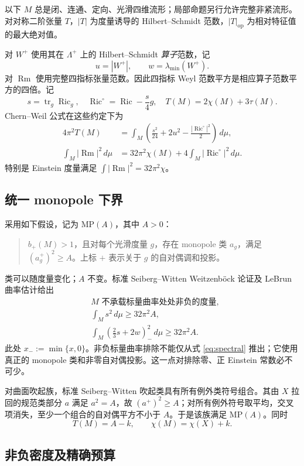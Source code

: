 \documentclass[UTF8,fontset=fandol,zihao=-4]{ctexart}
\theoremstyle{cn}
\DeclareMathOperator{\Ric}{Ric}
\DeclareMathOperator{\Rm}{Rm}
\DeclareMathOperator{\tr}{tr}
\newcommand{\op}{\mathrm{op}}
\newcommand{\dd}{\,d\mu}
\numberwithin{equation}{section}
\begin{document}
以下 $M$ 总是闭、连通、定向、光滑四维流形；局部命题另行允许完整非紧流形。对对称二阶张量 $T$，$|T|$ 为度量诱导的 Hilbert--Schmidt 范数，$|T|_{\op}$ 为相对特征值的最大绝对值。

对 $W^+$ 使用其在 $\Lambda^+$ 上的 Hilbert--Schmidt \emph{算子}范数，记
\[
u=|W^+|,\qquad w=\lambda_{\min}(W^+).
\]
对 $\Rm$ 使用完整四指标张量范数。因此四指标 Weyl 范数平方是相应算子范数平方的四倍。记
\[
s=\tr_g\Ric_g,\quad \Ric^\circ=\Ric-\frac{s}{4}g,\quad
T(M)=2\chi(M)+3\tau(M).
\]
Chern--Weil 公式在这些约定下为
\begin{align}
4\pi^2T(M)&=\int_M\left(\frac{s^2}{24}+2u^2-\frac{|\Ric^\circ|^2}{2}\right)\dd,\label{eq:cw}\\
\int_M|\Rm|^2\dd&=32\pi^2\chi(M)+4\int_M|\Ric^\circ|^2\dd.\label{eq:fullrm}
\end{align}
特别是 Einstein 度量满足 $\int|\Rm|^2=32\pi^2\chi$。

\subsection{统一 monopole 下界}

采用如下假设，记为 $\mathrm{MP}(A)$，其中 $A>0$：
\begin{quote}
$b_+(M)>1$，且对每个光滑度量 $g$，存在 monopole 类 $a_g$，满足 $(a_g^+)^2\ge A$。上标 $+$ 表示关于 $g$ 的自对偶调和投影。
\end{quote}
类可以随度量变化；$A$ 不变。标准 Seiberg--Witten Weitzenböck 论证及 LeBrun 曲率估计给出\cite{lebrun2001,lebrun2004}
\begin{align}
&M\text{ 不承载标量曲率处处非负的度量},\label{eq:no-psc}\\
&\int_Ms^2\dd\ge32\pi^2A,\label{eq:scalar}\\
&\int_M\left(\frac23s+2w\right)_{-}^{\!2}\dd\ge32\pi^2A.\label{eq:spectral}
\end{align}
此处 $x_-:=\min\{x,0\}$。非负标量曲率排除不能仅从式 \eqref{eq:spectral} 推出；它使用真正的 monopole 类和非零自对偶投影。这一点对排除零、正 Einstein 常数必不可少。

对曲面吹起族，标准 Seiberg--Witten 吹起类具有所有例外类符号组合。其由 $X$ 拉回的规范类部分 $a$ 满足 $a^2=A$，故 $(a^+)^2\ge A$；对所有例外符号取平均，交叉项消失，至少一个组合的自对偶平方不小于 $A$。于是该族满足 $\mathrm{MP}(A)$。同时
\begin{equation}\label{eq:blow-top}
T(M)=A-k,\qquad \chi(M)=\chi(X)+k.
\end{equation}

\subsection{非负密度及精确预算}
\end{document}
